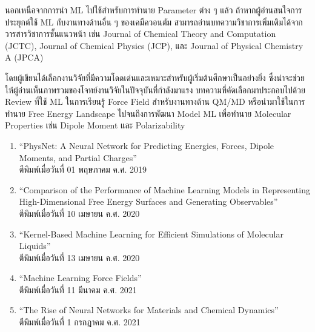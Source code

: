 นอกเหนือจากการนำ ML ไปใช้สำหรับการทำนาย Parameter ต่าง ๆ แล้ว ถ้าหากผู้อ่านสนใจการประยุกต์ใช้ ML กับงานทางด้านอื่น ๆ ของเคมีควอนตัม 
สามารถอ่านบทความวิชาการเพิ่มเติมได้จากวารสารวิชาการชั้นแนวหน้า เช่น Journal of Chemical Theory and Computation (JCTC), 
Journal of Chemical Physics (JCP), และ Journal of Physical Chemistry A (JPCA)

โดยผู้เขียนได้เลือกงานวิจัยที่มีความโดดเด่นและเหมาะสำหรับผู้เริ่มต้นศึกษาเป็นอย่างยิ่ง ซึ่งน่าจะช่วยให้ผู้อ่านเห็นภาพรวมของโจทย์งานวิจัยในปัจจุบันที่กำลังมาแรง
บทความที่คัดเลือกมาประกอบไปด้วย Review ที่ใช้ ML ในการเรียนรู้ Force Field สำหรับงานทางด้าน QM/MD หรือนำมาใช้ในการทำนาย Free Energy Landscape 
ไปจนถึงการพัฒนา Model ML เพื่อทำนาย Molecular Properties เช่น Dipole Moment และ Polarizability 

\begin{enumerate}
    \item \enquote{PhysNet: A Neural Network for Predicting Energies, Forces, Dipole Moments, and Partial Charges}\cite{unke2019}\\
    ตีพิมพ์เมื่อวันที่ 01 พฤษภาคม ค.ศ. 2019
    
    \item \enquote{Comparison of the Performance of Machine Learning Models in Representing High-Dimensional Free Energy Surfaces and Generating Observables}\cite{cendagorta2020}\\
    ตีพิมพ์เมื่อวันที่ 10 เมษายน ค.ศ. 2020
    
    \item \enquote{Kernel-Based Machine Learning for Efficient Simulations of Molecular Liquids}\cite{scherer2020}\\
    ตีพิมพ์เมื่อวันที่ 13 เมษายน ค.ศ. 2020

    \item \enquote{Machine Learning Force Fields}\cite{unke2021}\\
    ตีพิมพ์เมื่อวันที่ 11 มีนาคม ค.ศ. 2021\\

    \item \enquote{The Rise of Neural Networks for Materials and Chemical Dynamics}\cite{kulichenko2021}\\
    ตีพิมพ์เมื่อวันที่ 1 กรกฎาคม ค.ศ. 2021\\

\end{enumerate}
